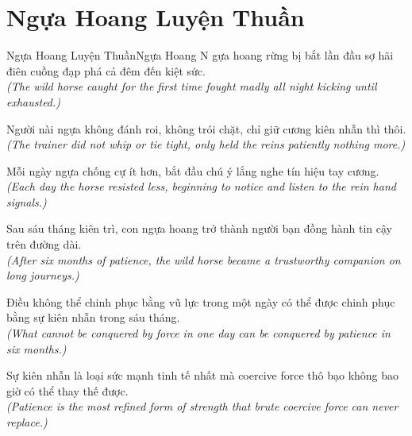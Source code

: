 \section{Ngựa Hoang Luyện Thuần}
\begin{truyen}{Ngựa Hoang Luyện Thuần}{Ngựa Hoang}
N gựa hoang rừng bị bắt lần đầu sợ hãi điên cuồng đạp phá cả đêm đến kiệt sức.\\
\textit{(The wild horse caught for the first time fought madly all night kicking until exhausted.)}

Người nài ngựa không đánh roi, không trói chặt, chỉ giữ cương kiên nhẫn thì thôi.\\
\textit{(The trainer did not whip or tie tight, only held the reins patiently nothing more.)}

Mỗi ngày ngựa chống cự ít hơn, bắt đầu chú ý lắng nghe tín hiệu tay cương.\\
\textit{(Each day the horse resisted less, beginning to notice and listen to the rein hand signals.)}

Sau sáu tháng kiên trì, con ngựa hoang trở thành người bạn đồng hành tin cậy trên đường dài.\\
\textit{(After six months of patience, the wild horse became a trustworthy companion on long journeys.)}

Điều không thể chinh phục bằng vũ lực trong một ngày có thể được chinh phục bằng sự kiên nhẫn trong sáu tháng.\\
\textit{(What cannot be conquered by force in one day can be conquered by patience in six months.)}

\end{truyen}
\begin{baihoc}
  Sự kiên nhẫn là loại sức mạnh tinh tế nhất mà coercive force thô bạo không bao giờ có thể thay thế được.\\
  \textit{(Patience is the most refined form of strength that brute coercive force can never replace.)}
\end{baihoc}

